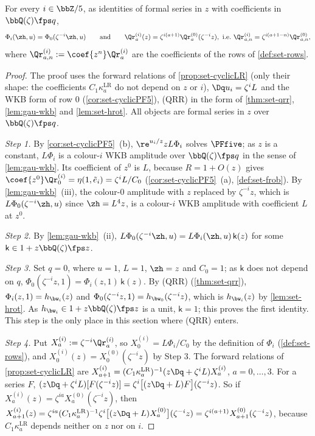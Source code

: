 
\begin{lem}
\label{lem:gau-colrows}
For every $i\in\bbZ/5$, as identities of formal series in $z$ with coefficients in $\bbQ(\zeta)\fps q$,
\[
\Phi_i(\zh,u)=\Phi_0(\zeta^{-i}\zh,u)\qquad\text{and}\qquad \Qr^{(i)}_a(z)=\zeta^{i(a+1)}\Qr^{(0)}_a(\zeta^{-i}z),\ \text{i.e.}\ \Qr^{(i)}_{a,n}=\zeta^{i(a+1-n)}\Qr^{(0)}_{a,n},
\]
where $\Qr^{(i)}_{a,n}:=\coef{z^n}\Qr^{(i)}_a$ are the coefficients of the rows of \cref{def:set-rows}.
\end{lem}

\begin{proof}
The proof uses the forward relations of \cref{prop:set-cyclicLR} (only their shape: the coefficients $C_1\kappa^{\mathrm{LR}}_a$ do not depend on $z$ or $i$), $\Dq u_i=\zeta^iL$ and the WKB form of row $0$ (\cref{cor:set-cyclicPF5}), (QRR) in the form of \cref{thm:set-qrr}, \cref{lem:gau-wkb} and \cref{lem:set-hrot}. All objects are formal series in $z$ over $\bbQ(\zeta)\fps q$.

\emph{Step 1.} By \cref{cor:set-cyclicPF5}~(b), $\re^{u_i/z}zL\Phi_i$ solves $\PFfive$; as $z$ is a constant, $L\Phi_i$ is a colour-$i$ WKB amplitude over $\bbQ(\zeta)\fps q$ in the sense of \cref{lem:gau-wkb}. Its coefficient of $z^0$ is $L$, because $R=1+O(z)$ gives $\coef{z^0}\Qr^{(i)}_0=\eta(1,\tilde e_i)=\zeta^iL/C_0$ (\cref{cor:set-cyclicPF5}~(a), \cref{def:set-frob}). By \cref{lem:gau-wkb}~(iii), the colour-$0$ amplitude with $z$ replaced by $\zeta^{-i}z$, which is $L\Phi_0(\zeta^{-i}\zh,u)$ since $\zh=L^4z$, is a colour-$i$ WKB amplitude with coefficient $L$ at $z^0$.

\emph{Step 2.} By \cref{lem:gau-wkb}~(ii), $L\Phi_0(\zeta^{-i}\zh,u)=L\Phi_i(\zh,u)\,\mathsf k(z)$ for some $\mathsf k\in1+z\bbQ(\zeta)\fps z$.

\emph{Step 3.} Set $q=0$, where $u=1$, $L=1$, $\zh=z$ and $C_0=1$; as $\mathsf k$ does not depend on $q$, $\Phi_0(\zeta^{-i}z,1)=\Phi_i(z,1)\,\mathsf k(z)$. By (QRR) (\cref{thm:set-qrr}), $\Phi_i(z,1)=h_{\bw_i}(z)$ and $\Phi_0(\zeta^{-i}z,1)=h_{\bw_0}(\zeta^{-i}z)$, which is $h_{\bw_i}(z)$ by \cref{lem:set-hrot}. As $h_{\bw_i}\in1+z\bbQ(\zeta)\fps z$ is a unit, $\mathsf k=1$; this proves the first identity. This step is the only place in this section where (QRR) enters.

\emph{Step 4.} Put $X^{(i)}_a:=\zeta^{-i}\Qr^{(i)}_a$, so $X^{(i)}_0=L\Phi_i/C_0$ by the definition of $\Phi_i$ (\cref{def:set-rows}), and $X^{(i)}_0(z)=X^{(0)}_0(\zeta^{-i}z)$ by Step 3. The forward relations of \cref{prop:set-cyclicLR} are $X^{(i)}_{a+1}=(C_1\kappa^{\mathrm{LR}}_a)^{-1}(z\Dq+\zeta^iL)X^{(i)}_a$, $a=0,\dots,3$. For a series $F$, $(z\Dq+\zeta^iL)[F(\zeta^{-i}z)]=\zeta^i\bigl[(z\Dq+L)F\bigr](\zeta^{-i}z)$. So if $X^{(i)}_a(z)=\zeta^{ia}X^{(0)}_a(\zeta^{-i}z)$, then $X^{(i)}_{a+1}(z)=\zeta^{ia}(C_1\kappa^{\mathrm{LR}}_a)^{-1}\zeta^i\bigl[(z\Dq+L)X^{(0)}_a\bigr](\zeta^{-i}z)=\zeta^{i(a+1)}X^{(0)}_{a+1}(\zeta^{-i}z)$, because $C_1\kappa^{\mathrm{LR}}_a$ depends neither on $z$ nor on $i$.


\end{proof}
